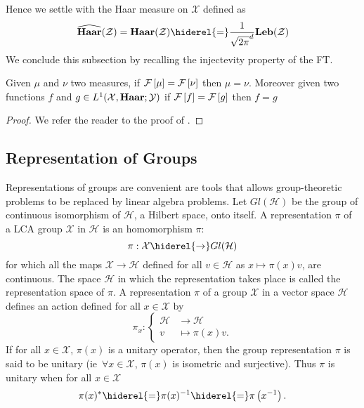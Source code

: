 Hence we settle with the Haar measure on $\mathcal{X}$ defined as
\begin{dmath*}
    \dual{\Haar}(\mathcal{Z})
    = \Haar(\mathcal{Z})
    \hiderel{=} \frac{1}{\sqrt{2\pi}^d} \Leb(\mathcal{Z})
\end{dmath*}
We conclude this subsection by recalling the injectevity property of the
\acl{FT}.
\begin{corollary}
    Given $\mu$ and $\nu$ two measures, if $\mathcal{F}\left[\mu\right]=\mathcal{F}\left[\nu\right]$ then $\mu=\nu$.
    Moreover given two functions $f$ and $g\in
    L^1(\mathcal{X},\mathbf{Haar};\mathcal{Y})$ if $\mathcal{F}\left[f\right]=\mathcal{F}\left[g\right]$ then $f=g$
\end{corollary}
\begin{proof}
    We refer the reader to the proof of \citet[corollary~4.34
    page~112]{folland1994course}.
\end{proof}

\subsection{Representation of Groups}
Representations of groups are convenient are tools that allows
group\--\-theo\-re\-tic problems to be replaced by linear algebra problems. Let
$Gl(\mathcal{H})$ be the group of continuous isomorphism of $\mathcal{H}$, a
Hilbert space, onto itself. A representation $\pi$ of a \ac{LCA} group
$\mathcal{X}$ in $\mathcal{H}$ is an homomorphism $\pi$:
\begin{dmath*}
    \pi:\mathcal{X}\hiderel{\to} Gl(\mathcal{H})
\end{dmath*}
for which all the maps $\mathcal{X}\to\mathcal{H}$ defined for all
$v\in\mathcal{H}$ as $x\mapsto \pi(x)v$, are continuous. The space
$\mathcal{H}$ in which the representation takes place is called the
representation space of $\pi$. A representation $\pi$ of a group $\mathcal{X}$
in a vector space $\mathcal{H}$ defines an action defined for all
$x\in\mathcal{X}$ by
\begin{dmath*}
    \pi_x:
    \begin{cases}
        \mathcal{H}&\to\mathcal{H} \\
        v &\mapsto \pi(x)v.
    \end{cases}
\end{dmath*}
If for all $x\in\mathcal{X}$, $\pi(x)$ is a unitary operator, then the group
representation $\pi$ is said to be unitary (\acs{ie}~$\forall x\in\mathcal{X}$,
$\pi(x)$ is isometric and surjective). Thus $\pi$ is unitary when for all
$x\in\mathcal{X}$
\begin{dmath*}
    \pi(x)^*\hiderel{=}\pi(x)^{-1}\hiderel{=}\pi\left(x^{-1}\right).
\end{dmath*}
